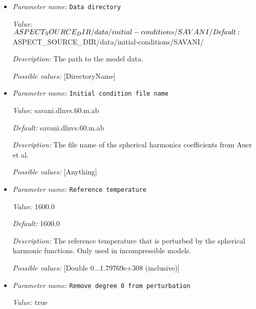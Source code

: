 \begin{itemize}
\item {\it Parameter name:} {\tt Data directory}
\label{parameters:Initial conditions/SAVANI perturbation/Data directory}


{\it Value:} $ASPECT_SOURCE_DIR/data/initial-conditions/SAVANI/


{\it Default:} $ASPECT_SOURCE_DIR/data/initial-conditions/SAVANI/


{\it Description:} The path to the model data. 


{\it Possible values:} [DirectoryName]
\item {\it Parameter name:} {\tt Initial condition file name}
\label{parameters:Initial conditions/SAVANI perturbation/Initial condition file name}


{\it Value:} savani.dlnvs.60.m.ab


{\it Default:} savani.dlnvs.60.m.ab


{\it Description:} The file name of the spherical harmonics coefficients from Auer et al.


{\it Possible values:} [Anything]
\item {\it Parameter name:} {\tt Reference temperature}
\label{parameters:Initial conditions/SAVANI perturbation/Reference temperature}


{\it Value:} 1600.0


{\it Default:} 1600.0


{\it Description:} The reference temperature that is perturbed by the spherical harmonic functions. Only used in incompressible models.


{\it Possible values:} [Double 0...1.79769e+308 (inclusive)]
\item {\it Parameter name:} {\tt Remove degree 0 from perturbation}
\label{parameters:Initial conditions/SAVANI perturbation/Remove degree 0 from perturbation}


{\it Value:} true



\end{itemize}
